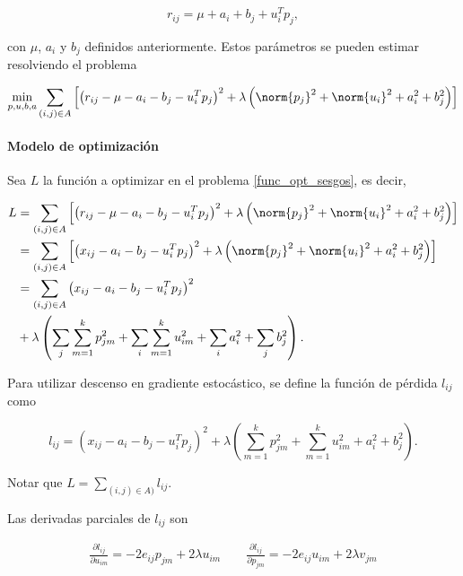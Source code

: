 \begin{equation}\label{ec_fact_sesgo}
r_{ij} = \mu + a_i + b_j + u_i^T p_j,
\end{equation}

con $\mu$, $a_i$ y $b_j$ definidos anteriormente. Estos parámetros se pueden estimar resolviendo el problema

\begin{equation}\label{func_opt_sesgos}
  \min_{p, u, b, a} \sum_{(i,j) \in A} \left [ \left( r_{ij} - \mu - a_i - b_j - u_i^T p_j \right) ^2 + \lambda \left( \norm{p_j}^2 + \norm{u_i}^2 + a_i^2 + b_j^2 \right) \right ]
\end{equation}

\paragraph{Modelo de optimización}

Sea $L$ la función a optimizar en el problema \ref{func_opt_sesgos}, es decir,

\[
\begin{split}
L 
& = \sum_{(i,j) \in A} \left [ \left( r_{ij} - \mu - a_i - b_j - u_i^T p_j \right) ^2 + 
\lambda \left( \norm{p_j}^2 + \norm{u_i}^2 + a_i^2 + b_j^2 \right) \right ] \\
& = \sum_{(i,j) \in A} \left [ \left( x_{ij} - a_i - b_j - u_i^T p_j \right) ^2 + \lambda \left( \norm{p_j}^2 + \norm{u_i}^2 + a_i^2 + b_j^2 \right) \right ] \\
& = \sum_{(i,j) \in A} \left( x_{ij} - a_i - b_j - u_i^T p_j \right) ^2 \\
& + \lambda \left( 
\sum_j \sum_{m = 1}^{k}p_{jm}^2 + 
\sum_i \sum_{m = 1}^{k}u_{im}^2 + 
\sum_i a_i^2 + 
\sum_j b_j^2 \right) .
\end{split}
\]

Para utilizar descenso en gradiente estocástico, se define la función de pérdida $l_{ij}$ como

\[
l_{ij} = \left( x_{ij} - a_i - b_j - u_i^T p_j \right) ^2
+ \lambda \left( 
\sum_{m = 1}^{k}p_{jm}^2 + 
\sum_{m = 1}^{k}u_{im}^2 + 
a_i^2 + 
b_j^2 \right) .
\]

Notar que $L = \sum_{(i,j) \in A)} l_{ij}$.

Las derivadas parciales de $l_{ij}$ son

\[
\begin{split}
\frac{\partial l_{ij}}{\partial u_{im}} = -2 e_{ij} p_{jm} + 2 \lambda u_{im} 
\qquad
\frac{\partial l_{ij}}{\partial p_{jm}} = -2 e_{ij} u_{im} + 2 \lambda v_{jm}
\end{split}
\]

